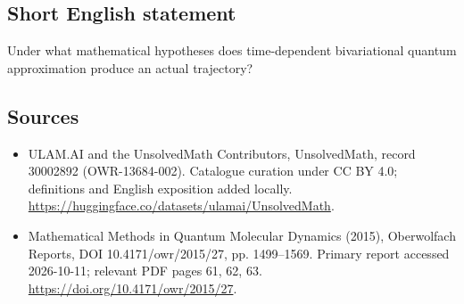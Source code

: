 \documentclass[11pt]{article}
\begin{document}
\subsection{Short English statement}
Under what mathematical hypotheses does time-dependent bivariational quantum approximation produce an actual trajectory?
\subsection{Sources}
\begin{itemize}
\item[\hypertarget{source:30002892:1}{S1}] ULAM.AI and the UnsolvedMath Contributors, UnsolvedMath, record 30002892 (OWR-13684-002). Catalogue curation under CC BY 4.0; definitions and English exposition added locally.
\url{https://huggingface.co/datasets/ulamai/UnsolvedMath}.
\item[\hypertarget{source:30002892:2}{S2}] Mathematical Methods in Quantum Molecular Dynamics (2015), Oberwolfach Reports, DOI 10.4171/owr/2015/27, pp. 1499--1569. Primary report accessed 2026-10-11; relevant PDF pages 61, 62, 63.
\url{https://doi.org/10.4171/owr/2015/27}.
\end{itemize}
\label{end:30002892}
\end{document}
